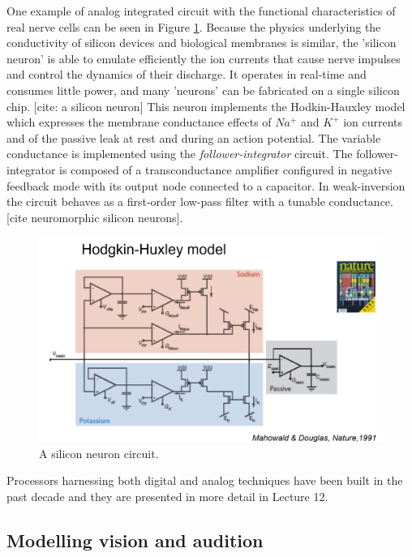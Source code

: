 \documentclass[main]{subfiles}
\begin{document}
One example of analog integrated circuit with the functional characteristics of real nerve cells can be seen in Figure \ref{fig:hh}. Because the physics underlying the conductivity of silicon devices and biological membranes is similar, the 'silicon neuron' is able to emulate efficiently the ion currents that cause nerve impulses and control the dynamics of their discharge. It operates in real-time and consumes little power, and many 'neurons' can be fabricated on a single silicon chip.  [cite: a silicon neuron] This neuron implements the Hodkin-Hauxley model which expresses the membrane conductance effects of $Na^+$ and $K^+$ ion currents and of the passive leak at rest and during an action potential. The variable conductance is implemented using the \textit{follower-integrator} circuit. The follower-integrator is composed of a transconductance amplifier configured in negative feedback mode with its output node connected to a capacitor. In weak-inversion the circuit behaves as a first-order low-pass filter with a tunable conductance. [cite neuromorphic silicon neurons].
%
\begin{figure}[h]
    \centering
    \includegraphics[width=0.8\linewidth]{11_NeuromorphicSystems1/figures/hh_model.png}
    \caption{A silicon neuron circuit.}
    \label{fig:hh}
\end{figure}
%

Processors harnessing both digital and analog techniques have been built in the past decade and they are presented in more detail in Lecture 12.

\subsection{Modelling vision and audition}
\end{document}
